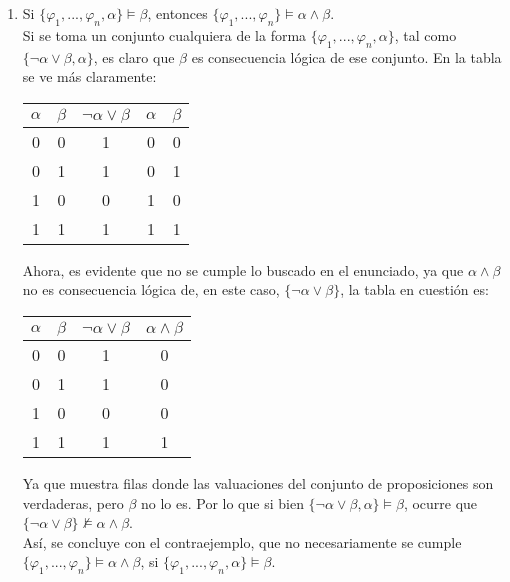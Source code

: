 \documentclass[letter]{article}
\begin{document}
\begin{pregunta}{2}
\begin{enumerate}
		\item
			Si $\{\varphi_1, ..., \varphi_n, \alpha\} \models \beta$, entonces $\{\varphi_1, ..., \varphi_n\} \models \alpha \wedge \beta$.\\
			
			Si se toma un conjunto cualquiera de la forma $\{\varphi_1, ..., \varphi_n, \alpha\}$, tal como $\{\neg\alpha \vee \beta, \alpha\}$, es claro que $\beta$ es consecuencia lógica de ese conjunto. En la tabla se ve más claramente:
			
			\begin{center}
				\begin{tabular}{ cc|cc|c } 
				$\alpha$ & $\beta$ & $\neg\alpha \vee \beta$ & $\alpha$ & $\beta$\\
				\hline
				0 & 0 & 1 & 0 & 0\\
				0 & 1 & 1 & 0 & 1\\
				1 & 0 & 0 & 1 & 0\\
				\rowcolor{lightblue} 1 & 1 & 1 & 1 & 1\\
				\end{tabular}
			\end{center}
			
			Ahora, es evidente que no se cumple lo buscado en el enunciado, ya que $\alpha \wedge \beta$ no es consecuencia lógica de, en este caso, $\{\neg\alpha \vee \beta\}$, la tabla en cuestión es:
			
			\begin{center}
				\begin{tabular}{ cc|c|c } 
				$\alpha$ & $\beta$ & $\neg\alpha \vee \beta$ & $\alpha \wedge \beta$\\
				\hline
				\rowcolor{lightred} 0 & 0 & 1 & 0\\
				\rowcolor{lightred} 0 & 1 & 1 & 0\\
				1 & 0 & 0 & 0\\
				1 & 1 & 1 & 1\\
				\end{tabular}
			\end{center}
			
			Ya que muestra filas donde las valuaciones del conjunto de proposiciones son verdaderas, pero $\beta$ no lo es. Por lo que si bien $\{\neg\alpha \vee \beta, \alpha\} \models \beta$, ocurre que $\{\neg\alpha \vee \beta\} \not\models \alpha \wedge \beta$.\\
			
			Así, se concluye con el contraejemplo, que no necesariamente se cumple $\{\varphi_1, ..., \varphi_n\} \models \alpha \wedge \beta$, si $\{\varphi_1, ..., \varphi_n, \alpha\} \models \beta$.
			
		\end{enumerate}
		
	\end{pregunta}
\end{document}
